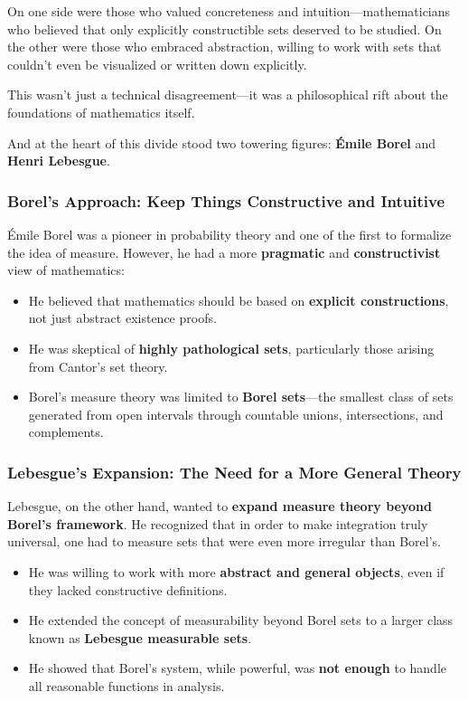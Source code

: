 On one side were those who valued concreteness and intuition—mathematicians who believed that only explicitly constructible sets deserved to be studied. On the other were those who embraced abstraction, willing to work with sets that couldn’t even be visualized or written down explicitly.

This wasn’t just a technical disagreement—it was a philosophical rift about the foundations of mathematics itself.

And at the heart of this divide stood two towering figures: \textbf{Émile Borel} and \textbf{Henri Lebesgue}.

\subsubsection{Borel’s Approach: Keep Things Constructive and Intuitive}

Émile Borel was a pioneer in probability theory and one of the first to formalize the idea of measure. However, he had a more \textbf{pragmatic} and \textbf{constructivist} view of mathematics:

\begin{itemize}
    \item He believed that mathematics should be based on \textbf{explicit constructions}, not just abstract existence proofs.
    \item He was skeptical of \textbf{highly pathological sets}, particularly those arising from Cantor’s set theory.
    \item Borel’s measure theory was limited to \textbf{Borel sets}—the smallest class of sets generated from open intervals through countable unions, intersections, and complements.
\end{itemize}

\subsubsection{Lebesgue’s Expansion: The Need for a More General Theory}

Lebesgue, on the other hand, wanted to \textbf{expand measure theory beyond Borel’s framework}. He recognized that in order to make integration truly universal, one had to measure sets that were even more irregular than Borel’s.

\begin{itemize}
    \item He was willing to work with more \textbf{abstract and general objects}, even if they lacked constructive definitions.
    \item He extended the concept of measurability beyond Borel sets to a larger class known as \textbf{Lebesgue measurable sets}.
    \item He showed that Borel’s system, while powerful, was \textbf{not enough} to handle all reasonable functions in analysis.
\end{itemize}

